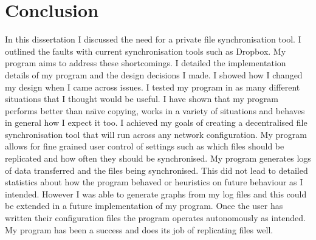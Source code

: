 \documentclass[12pt]{article}
\begin{document}
\newpage
\section{Conclusion}
In this dissertation I discussed the need for a private file
synchronisation tool. I outlined the faults with
current synchronisation tools such as Dropbox. My program
aims to address these shortcomings. I detailed the
implementation details of my program and the design
decisions I made. I showed how I changed my design
when I came across issues.
I tested my program in as many different situations that
I thought would be useful. I have shown that my program
performs better than na\"{\i}ve copying,
works in a variety of situations and behaves in general
how I expect it too.
I achieved my goals of creating a decentralised
file synchronisation tool that will run across any network configuration.
My program allows for fine grained user control
of settings such as which files should be replicated and how
often they should be synchronised. My program generates
logs of data transferred and the files being synchronised.
This did not lead to detailed statistics about how
the program behaved or heuristics on future behaviour
as I intended. However I was able to generate
graphs from my log files and this could be extended in
a future implementation of my program. Once the user
has written their configuration files the program
operates autonomously as intended. My program has
been a success and does its job of replicating
files well.

\end{document}
